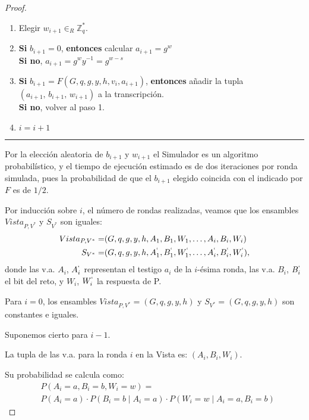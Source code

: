 \begin{proof}
\begin{enumerate}
		\item Elegir $w_{i+1} \in_R \mathbb{Z}_q^*$.
		
		\item \textbf{Si} $b_{i+1} = 0$, \textbf{entonces} calcular \qquad $a_{i+1} = g^w$ \\
		\textbf{Si no}, \qquad \qquad \qquad \qquad \qquad \qquad \quad $a_{i+1} = g^w y^{-1} = g^{w-s}$
		
		\item \textbf{Si} $b_{i+1} = F(G, q, g, y,h,v_i,a_{i+1})$, \textbf{entonces} añadir la tupla \\ $(a_{i+1},\,b_{i+1},\,w_{i+1})$ a la transcripción. \\
		\textbf{Si no}, volver al paso 1.
		
		\item $i = i+1$
		
	\end{enumerate}
	
	\rule{\textwidth}{1pt}
	
	\hfill
	
	Por la elección aleatoria de $b_{i+1}$ y $w_{i+1}$ el Simulador es un algoritmo probabilístico, y el tiempo de ejecución estimado es de dos iteraciones por ronda simulada, pues la probabilidad de que el $b_{i+1}$ elegido coincida con el indicado por $F$ es de $1/2$.
	
	
	\hfil
	
	
	Por inducción sobre $i$, el número de rondas realizadas, veamos que los ensambles $Vista_{P,V^*}$ y $S_{V^*}$ son iguales:
	\begin{align*}
		Vista_{P,V^*} =& (G,q,g,y,h,A_1,B_1,W_1, \dots , A_i,B_i,W_i) \\
		S_{V^*} =& (G,q,g,y,h,A_1^`,B_1^`,W_1^`, \dots , A_i^`,B_i^`,W_i^`),
	\end{align*}
	donde las v.a. $A_i$, $A_i^`$ representan el testigo $a_i$ de la $i$-ésima ronda, las v.a. $B_i$, $B_i^`$ el bit del reto, y $W_i$, $W_i^`$ la respuesta de P.
	
	\hfil
	
	Para $i=0$, los ensambles $Vista_{P,V^*} = (G,q,g,y,h)$ y $S_{V^*} = (G,q,g,y,h)$ son constantes e iguales.
	
	Suponemos cierto para $i-1$.
	
	La tupla de las v.a. para la ronda $i$ en la Vista es: $(A_i,B_i,W_i)$.
	
	Su probabilidad se calcula como:
	\begin{align*}
	& P(A_i=a, B_i=b, W_i = w) = \\
	& P(A_i = a) \cdot P(B_i = b \mid A_i = a) \cdot P(W_i = w \mid A_i = a, B_i=b)
	\end{align*}
	

\end{proof}
